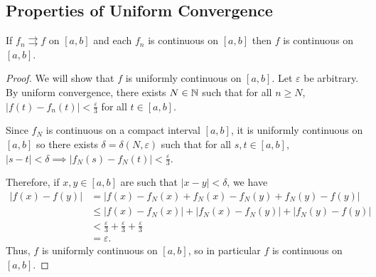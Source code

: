 \documentclass[../analysis1.tex]{subfiles}
\begin{document}
\subsection{Properties of Uniform Convergence}
\begin{theorem}
\label{thm:ucc}
    \begin{shaded*}
        If $f_n\rightrightarrows f$ on $[a,b]$ and each $f_n$ is continuous on $[a,b]$ then $f$ is continuous on $[a,b]$.
    \end{shaded*}
\end{theorem}
\begin{proof}
    We will show that $f$ is uniformly continuous on $[a,b]$. Let $\varepsilon$ be arbitrary. By uniform convergence, there exists $N\in\mathbb{N}$ such that for all $n\ge N$, $|f(t)-f_n(t)|<\frac{\varepsilon}{3}$ for all $t\in[a,b]$.

    Since $f_N$ is continuous on a compact interval $[a,b]$, it is uniformly continuous on $[a,b]$ so there exists $\delta=\delta(N,\varepsilon)$ such that for all $s,t\in [a,b]$, $|s-t|<\delta\implies |f_N(s)-f_N(t)|<\frac{\varepsilon}{3}$.
    
    Therefore, if $x,y\in[a,b]$ are such that $|x-y|<\delta$, we have
    \begin{align*}
        |f(x)-f(y)|&=|f(x)-f_N(x)+f_N(x)-f_N(y)+f_N(y)-f(y)|\\
        &\le |f(x)-f_N(x)|+|f_N(x)-f_N(y)|+|f_N(y)-f(y)|\\
        &< \frac{\varepsilon}{3}+\frac{\varepsilon}{3}+\frac{\varepsilon}{3}\\
        &=\varepsilon.
    \end{align*}
Thus, $f$ is uniformly continuous on $[a,b]$, so in particular $f$ is continuous on $[a,b]$.\qedhere
\end{proof}
\end{document}
